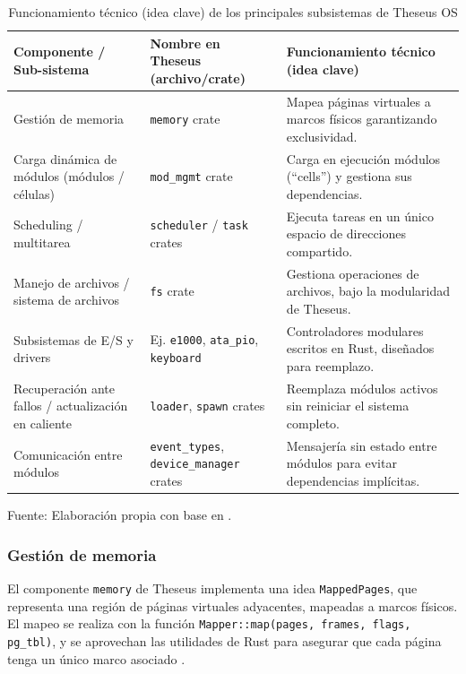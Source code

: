 \begin{table}[H]
\centering
\caption{Funcionamiento técnico (idea clave) de los principales subsistemas de Theseus OS}
\begin{tabular}{|p{5cm}|p{4cm}|p{6cm}|}
\hline
\textbf{Componente / Sub-sistema} & \textbf{Nombre en Theseus (archivo/crate)} & \textbf{Funcionamiento técnico (idea clave)} \\ \hline
Gestión de memoria & \texttt{memory} crate & Mapea páginas virtuales a marcos físicos garantizando exclusividad. \\ \hline
Carga dinámica de módulos (módulos / células) & \texttt{mod\_mgmt} crate & Carga en ejecución módulos (“cells”) y gestiona sus dependencias. \\ \hline
Scheduling / multitarea & \texttt{scheduler} / \texttt{task} crates & Ejecuta tareas en un único espacio de direcciones compartido. \\ \hline
Manejo de archivos / sistema de archivos & \texttt{fs} crate & Gestiona operaciones de archivos, bajo la modularidad de Theseus. \\ \hline
Subsistemas de E/S y drivers & Ej. \texttt{e1000}, \texttt{ata\_pio}, \texttt{keyboard} & Controladores modulares escritos en Rust, diseñados para reemplazo. \\ \hline
Recuperación ante fallos / actualización en caliente & \texttt{loader}, \texttt{spawn} crates & Reemplaza módulos activos sin reiniciar el sistema completo. \\ \hline
Comunicación entre módulos & \texttt{event\_types}, \texttt{device\_manager} crates & Mensajería sin estado entre módulos para evitar dependencias implícitas. \\ \hline
\end{tabular}
\centering
Fuente: Elaboración propia con base en \citep{boos2020theseus, theseus2023, boos2017theseus}.
\end{table}

\subsubsection*{Gestión de memoria}
El componente \texttt{memory} de Theseus implementa una idea \texttt{MappedPages}, que representa una región de páginas virtuales adyacentes, mapeadas a marcos físicos. El mapeo se realiza con la función \texttt{Mapper::map(pages, frames, flags, pg\_tbl)}, y se aprovechan las utilidades de Rust para asegurar que cada página tenga un único marco asociado \citep{boos2020theseus, theseus2023}.

